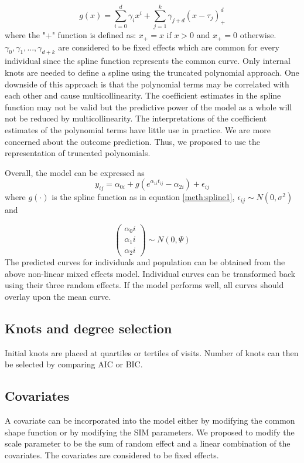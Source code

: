 \documentclass{article}
\numberwithin{equation}{section}
\begin{document}
\begin{equation}\label{meth:spline1}
g(x) = \sum_{i=0}^{d}\gamma_{i} x ^i + \sum_{j=1}^{k}\gamma_{j+d}(x-\tau_j)_{+}^d
\end{equation}
where the "+" function is defined as: $x_{+} = x$ if $x>0$ and $x_{+} = 0$ otherwise. $\gamma_{0},\gamma_{1},...,\gamma_{d+k}$ are considered to be fixed effects which are common for every individual since the spline function represents the common curve. Only internal knots are needed to define a spline using the truncated polynomial approach. One downside of this approach is that the polynomial terms may be correlated with each other and cause multicollinearity. The coefficient estimates in the spline function may not be valid but the predictive power of the model as a whole will not be reduced by multicollinearity. The interpretations of the coefficient estimates of the polynomial terms have little use in practice. We are more concerned about the outcome prediction. Thus, we proposed to use the representation of truncated polynomials.

Overall, the model can be expressed as 
\begin{equation}\label{meth:sim2}
y_{ij}=\alpha_{0i}+g(e^{\alpha_{1i}t_{ij}} -\alpha_{2i}) + \epsilon_{ij}
\end{equation}
 where $g(\cdot)$ is the spline function as in equation \ref{meth:spline1}, $\epsilon_{ij} \sim N(0,\sigma^2)$ and 
 
 
 \begin{equation}
\left(\begin{array}{lr}
\alpha_0i\\
 \alpha_1i\\
 \alpha_2i
 \end{array}\right) \sim N(0,\Psi)
\end{equation}
 The predicted curves for individuals and population can be obtained from the above non-linear mixed effects model. Individual curves can be transformed back using their three random effects. If the model performs well, all curves should overlay upon the mean curve.
 
 \subsection{Knots and degree selection}
  Initial knots are placed at quartiles or tertiles of visits. Number of knots can then be selected by comparing AIC or BIC. 
  
\subsection{Covariates}
A covariate can be incorporated into the model either by modifying the common shape function or by modifying the SIM parameters. We proposed to modify the scale parameter to be the sum of random effect and a linear combination of the covariates. The covariates are considered to be fixed effects. 
\end{document}
